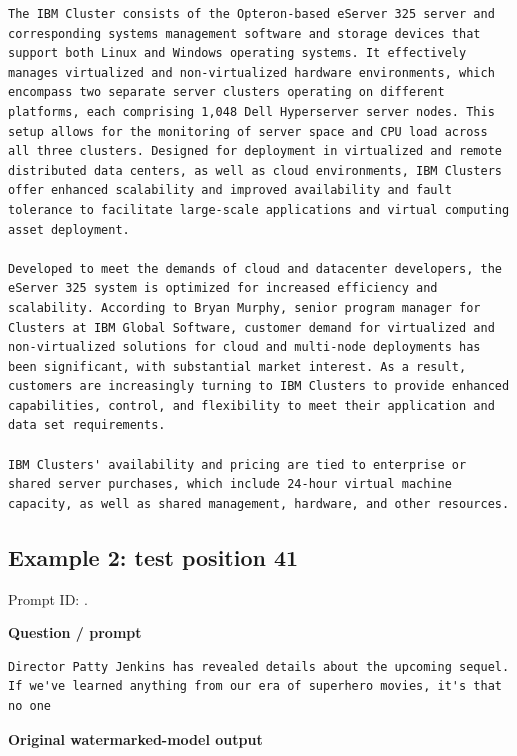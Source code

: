 \begin{Verbatim}
The IBM Cluster consists of the Opteron-based eServer 325 server and corresponding systems management software and storage devices that support both Linux and Windows operating systems. It effectively manages virtualized and non-virtualized hardware environments, which encompass two separate server clusters operating on different platforms, each comprising 1,048 Dell Hyperserver server nodes. This setup allows for the monitoring of server space and CPU load across all three clusters. Designed for deployment in virtualized and remote distributed data centers, as well as cloud environments, IBM Clusters offer enhanced scalability and improved availability and fault tolerance to facilitate large-scale applications and virtual computing asset deployment.

Developed to meet the demands of cloud and datacenter developers, the eServer 325 system is optimized for increased efficiency and scalability. According to Bryan Murphy, senior program manager for Clusters at IBM Global Software, customer demand for virtualized and non-virtualized solutions for cloud and multi-node deployments has been significant, with substantial market interest. As a result, customers are increasingly turning to IBM Clusters to provide enhanced capabilities, control, and flexibility to meet their application and data set requirements.

IBM Clusters' availability and pricing are tied to enterprise or shared server purchases, which include 24-hour virtual machine capacity, as well as shared management, hardware, and other resources.
\end{Verbatim}

\subsection{Example 2: test position
41}\label{record-docs-watermarking-qualitative-paper-sir-vanilla-md-example-2-test-position-41}

Prompt ID:
\texttt{}.

\textbf{Question / prompt}

\begin{Verbatim}
Director Patty Jenkins has revealed details about the upcoming sequel.
If we've learned anything from our era of superhero movies, it's that no one
\end{Verbatim}

\textbf{Original watermarked-model output}

